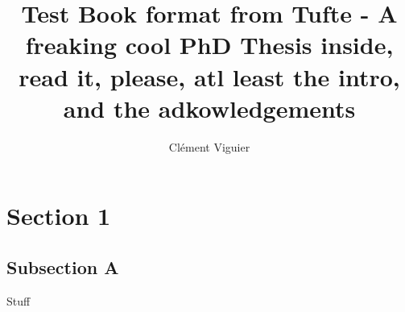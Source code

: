 \documentclass[a4paperg]{tufte-book}
\title{Test Book format from Tufte - A freaking cool PhD Thesis inside, read it, please, atl least the intro, and the adkowledgements}
\author{Clément Viguier}
\begin{document}
\maketitlepage


\newpage

\section{Section 1}
\subsection{Subsection A}

Stuff
\end{document}
